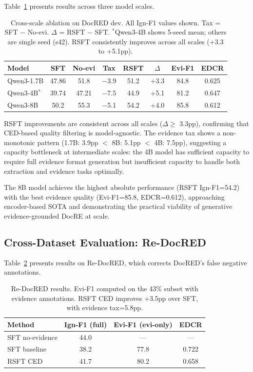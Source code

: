 \documentclass[11pt]{article}
\begin{document}
Table~\ref{tab:scale} presents results across three model scales.

\begin{table}[t]
\centering
\small
\begin{tabular}{lccccccc}
\toprule
\textbf{Model} & \textbf{SFT} & \textbf{No-evi} & \textbf{Tax} & \textbf{RSFT} & \textbf{$\Delta$} & \textbf{Evi-F1} & \textbf{EDCR} \\
\midrule
Qwen3-1.7B & 47.86 & 51.8 & $-$3.9 & 51.2 & +3.3 & 84.8 & 0.625 \\
Qwen3-4B$^*$ & 39.74 & 47.21 & $-$7.5 & 44.9 & +5.1 & 81.2 & 0.647 \\
Qwen3-8B & 50.2 & 55.3 & $-$5.1 & 54.2 & +4.0 & 85.8 & 0.612 \\
\bottomrule
\end{tabular}
\caption{Cross-scale ablation on DocRED dev. All Ign-F1 values shown. Tax = SFT $-$ No-evi. $\Delta$ = RSFT $-$ SFT. $^*$Qwen3-4B shows 5-seed mean; others are single seed (s42). RSFT consistently improves across all scales (+3.3 to +5.1pp).}
\label{tab:scale}
\end{table}

RSFT improvements are consistent across all scales ($\Delta \geq$ 3.3pp), confirming that CED-based quality filtering is model-agnostic. The evidence tax shows a non-monotonic pattern (1.7B: 3.9pp $<$ 8B: 5.1pp $<$ 4B: 7.5pp), suggesting a capacity bottleneck at intermediate scales: the 4B model has sufficient capacity to require full evidence format generation but insufficient capacity to handle both extraction and evidence tasks optimally.

The 8B model achieves the highest absolute performance (RSFT Ign-F1=54.2) with the best evidence quality (Evi-F1=85.8, EDCR=0.612), approaching encoder-based SOTA and demonstrating the practical viability of generative evidence-grounded DocRE at scale.

\subsection{Cross-Dataset Evaluation: Re-DocRED}

Table~\ref{tab:redocred} presents results on Re-DocRED, which corrects DocRED's false negative annotations.

\begin{table}[t]
\centering
\small
\begin{tabular}{lccc}
\toprule
\textbf{Method} & \textbf{Ign-F1 (full)} & \textbf{Evi-F1 (evi-only)} & \textbf{EDCR} \\
\midrule
SFT no-evidence & 44.0 & --- & --- \\
SFT baseline & 38.2 & 77.8 & 0.722 \\
RSFT CED & 41.7 & 80.2 & 0.658 \\
\bottomrule
\end{tabular}
\caption{Re-DocRED results. Evi-F1 computed on the 43\% subset with evidence annotations. RSFT CED improves +3.5pp over SFT, with evidence tax=5.8pp.}
\label{tab:redocred}
\end{table}
\end{document}
